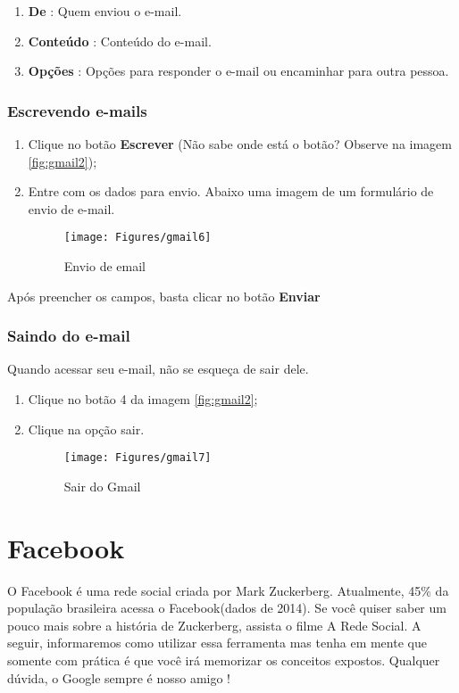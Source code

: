 \documentclass[hidelinks,12pt]{article}
\begin{document}
		\begin{enumerate}
			\item \textbf{De} : Quem enviou o e-mail.

			\item \textbf{Conteúdo} : Conteúdo do e-mail.

			\item \textbf{Opções} : Opções para responder o e-mail ou encaminhar para outra pessoa.
		\end{enumerate}

		\subsubsection{Escrevendo e-mails}

		\begin{enumerate}
			\item Clique no botão \textbf{Escrever} (Não sabe onde está o botão? Observe na imagem \ref{fig:gmail2});
			\item Entre com os dados para envio. Abaixo uma imagem de um formulário de envio de e-mail.

			\begin{figure}[!h]
				\centering
				\texttt{[image: Figures/gmail6]}
				\label{fig:gmail6}
				\caption{Envio de email}
			\end{figure}

		\end{enumerate}
		Após preencher os campos, basta clicar no botão \textbf{Enviar}
	\newpage
		\subsubsection{Saindo do e-mail}

		Quando acessar seu e-mail, não se esqueça de sair dele.

		\begin{enumerate}
			\item Clique no botão 4 da imagem \ref{fig:gmail2};

			\item Clique na opção sair.

			\begin{figure}[!h]
				\centering
				\texttt{[image: Figures/gmail7]}
				\label{fig:gmail7}
				\caption{Sair do Gmail}
			\end{figure}

		\end{enumerate}

	\section{Facebook}
	O Facebook é uma rede social criada por Mark Zuckerberg. Atualmente, 45\% da população brasileira acessa o Facebook(dados de 2014). Se você quiser saber um pouco mais sobre a história de Zuckerberg, assista o filme A Rede Social.
	A seguir, informaremos como utilizar essa ferramenta mas tenha em mente que somente com prática é que você irá memorizar os conceitos expostos. Qualquer dúvida, o Google sempre é nosso amigo !
\end{document}
